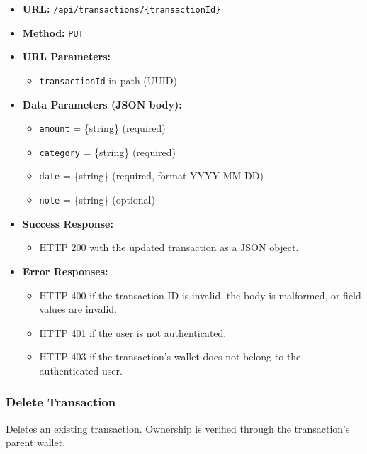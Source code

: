 \begin{itemize}
    \item \textbf{URL:} \texttt{/api/transactions/\{transactionId\}}
    \item \textbf{Method:} \texttt{PUT}
    \item \textbf{URL Parameters:}
    \begin{itemize}
        \item \texttt{transactionId} in path (UUID)
    \end{itemize}
    \item \textbf{Data Parameters (JSON body):}
    \begin{itemize}
        \item \texttt{amount} = \{string\} (required)
        \item \texttt{category} = \{string\} (required)
        \item \texttt{date} = \{string\} (required, format YYYY-MM-DD)
        \item \texttt{note} = \{string\} (optional)
    \end{itemize}
    \item \textbf{Success Response:}
    \begin{itemize}
        \item HTTP 200 with the updated transaction as a JSON object.
    \end{itemize}
    \item \textbf{Error Responses:}
    \begin{itemize}
        \item HTTP 400 if the transaction ID is invalid, the body is malformed, or field values are invalid.
        \item HTTP 401 if the user is not authenticated.
        \item HTTP 403 if the transaction's wallet does not belong to the authenticated user.
    \end{itemize}
\end{itemize}

\subsubsection{Delete Transaction}

Deletes an existing transaction. Ownership is verified through the transaction's parent wallet.

